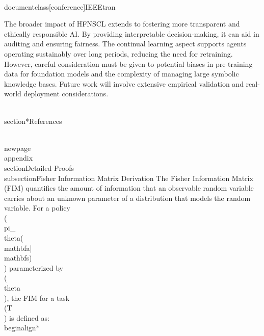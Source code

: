 \\documentclass[conference]{IEEEtran}
\begin{document}
The broader impact of HFNSCL extends to fostering more transparent and ethically responsible AI. By providing interpretable decision-making, it can aid in auditing and ensuring fairness. The continual learning aspect supports agents operating sustainably over long periods, reducing the need for retraining. However, careful consideration must be given to potential biases in pre-training data for foundation models and the complexity of managing large symbolic knowledge bases. Future work will involve extensive empirical validation and real-world deployment considerations.

\\section*{References}
\
\

\\newpage
\\appendix
\\section{Detailed Proofs}
\\subsection{Fisher Information Matrix Derivation}
The Fisher Information Matrix (FIM) quantifies the amount of information that an observable random variable carries about an unknown parameter of a distribution that models the random variable. For a policy \\(\\pi_\\theta(\\mathbf{a}|\\mathbf{s})\\) parameterized by \\(\\theta\\), the FIM for a task \\(T\\) is defined as:
\\begin{align*}
\end{document}
